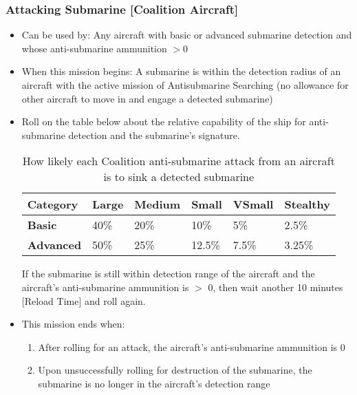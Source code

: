 \documentclass{article}
\begin{document}
    \subsubsection{Attacking Submarine [Coalition Aircraft]}
            \begin{itemize}
                \item Can be used by: Any aircraft with basic or advanced submarine detection and whose anti-submarine ammunition $>0$
                \item When this mission begins: A submarine is within the detection radius of an aircraft with the active mission of Antisubmarine Searching (no allowance for other aircraft to move in and engage a detected submarine)
                \item Roll on the table below about the relative capability of the ship for anti-submarine detection and the submarine's signature.
                
                \begin{table}[h!]
                    \centering
                    \begin{tabularx}{\textwidth}{|l|X|X|X|X|X|}
                    \hline
                    \textbf{Category} & \textbf{Large} & \textbf{Medium} & \textbf{Small} & \textbf{VSmall} & \textbf{Stealthy} \\
                    \hline
                    \textbf{Basic} & 40\% & 20\% & 10\% & 5\% & 2.5\% \\
                    \hline
                    \textbf{Advanced} & 50\% & 25\% & 12.5\% & 7.5\% & 3.25\% \\
                    \hline
                    \end{tabularx}
                    \caption{How likely each Coalition anti-submarine attack from an aircraft is to sink a detected submarine}
                    \label{table:CoalitionAircraftAttackingSubmarines}
                \end{table}
                
            If the submarine is still within detection range of the aircraft and the aircraft's anti-submarine ammunition is $>$ 0, then wait another 10 minutes [Reload Time] and roll again.
            
            \item This mission ends when:
            \begin{enumerate}[label=\arabic*)]
                \item After rolling for an attack, the aircraft's anti-submarine ammunition is 0\par
                [Aircraft mission becomes Transit to Base]
                \item Upon unsuccessfully rolling for destruction of the submarine, the submarine is no longer in the aircraft's detection range\par
                [Aircraft mission becomes Antisubmarine searching]
            \end{enumerate}
        \end{itemize}
\end{document}
